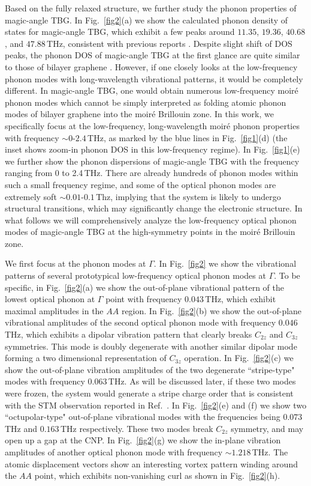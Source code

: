 \documentclass[aps,prl,twocolumn,amsmath,amssymb]{revtex4-2}
\begin{document}
Based on the fully relaxed structure, we further study the phonon properties of magic-angle TBG. In Fig.~\ref{fig2}(a) we show the calculated phonon density of states for magic-angle TBG, which exhibit a few peaks around $11.35$, $19.36$, $40.68$, and $47.88\,$THz, consistent with previous reports \cite{choi-prb18}. Despite slight shift of DOS peaks, the phonon DOS of magic-angle TBG at the first glance are quite similar to those of bilayer graphene \cite{choi-prb18,balandin-prb13}. However, if one closely looks at the low-frequency phonon modes with long-wavelength vibrational patterns, it would be completely different. In magic-angle TBG, one would obtain numerous low-frequency moir\'e phonon modes which cannot be simply interpreted as folding atomic phonon modes of bilayer graphene into the moir\'e Brillouin zone. In this work, we specifically focus at the low-frequency, long-wavelength moir\'e phonon properties with frequency $\sim\!0\textrm{-}2.4\,$THz, as marked by the blue lines in Fig.~\ref{fig1}(d) (the inset shows zoom-in phonon DOS in this low-frequency regime). In Fig.~\ref{fig1}(e) we further show the phonon dispersions 
of magic-angle TBG with the frequency ranging from 0 to 2.4\,THz. There are already hundreds of phonon modes within such a small frequency regime, and some of the optical phonon modes are extremely soft $\sim\!0.01\textrm{-}0.1\,$Thz, implying that the system is likely to undergo structural transitions, which may significantly change the electronic structure. In what follows we will comprehensively analyze the low-frequency optical phonon modes of magic-angle TBG at the high-symmetry points in the moir\'e Brillouin zone. 

We first focus at the phonon modes at $\Gamma$.  In Fig.~\ref{fig2} we show the vibrational patterns of several prototypical low-frequency optical phonon modes at $\Gamma$. To be specific, in Fig.~\ref{fig2}(a) we show the out-of-plane vibrational pattern of the lowest optical phonon at $\Gamma$ point with frequency $0.043\,$THz, which exhibit maximal amplitudes in the $AA$ region. In Fig.~\ref{fig2}(b) we show the  out-of-plane vibrational amplitudes of the second optical phonon mode with frequency $0.046\,$THz, which exhibits  a dipolar vibration pattern that clearly breaks $C_{2z}$ and $C_{3z}$ symmetries. This mode is doubly degenerate with another similar dipolar mode forming a two dimensional representation of $C_{3z}$ operation. In Fig.~\ref{fig2}(c) we show the out-of-plane vibration amplitudes of the two degenerate  ``stripe-type" modes with frequency $0.063\,$THz. As will be discussed later, if these two modes were frozen, the system would generate a stripe charge order that is consistent with the STM observation reported in Ref.~.  In Fig.~\ref{fig2}(e) and (f) we show two ``octupolar-type" out-of-plane vibrational modes with the frequencies being $0.073\,$THz and $0.163\,$THz respectively. These two modes break $C_{2z}$ symmetry, and may open up a gap at the CNP. In Fig.~\ref{fig2}(g) we show the in-plane vibration amplitudes of another optical phonon mode with frequency $\sim 1.218\,$THz. The atomic displacement vectors show an interesting vortex pattern winding around the $AA$ point, which exhibits non-vanishing curl as shown in Fig.~\ref{fig2}(h).
\end{document}
